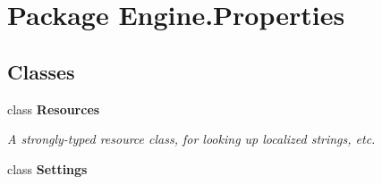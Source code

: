 \hypertarget{namespace_engine_1_1_properties}{\section{Package Engine.\-Properties}
\label{namespace_engine_1_1_properties}
}
\subsection*{Classes}
\begin{DoxyCompactItemize}
\item 
class {\bfseries Resources}
\begin{DoxyCompactList}\small\item\em A strongly-\/typed resource class, for looking up localized strings, etc. \end{DoxyCompactList}\item 
class {\bfseries Settings}
\end{DoxyCompactItemize}
